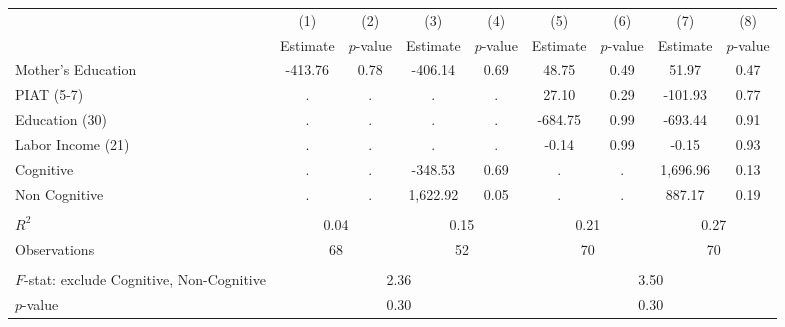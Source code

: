 \begin{tabular}{lcccccccc} \toprule
 & (1) & (2) & (3) & (4) & (5) & (6) & (7) & (8) \\
 & Estimate & $p$-value & Estimate & $p$-value  & Estimate & $p$-value  & Estimate & $p$-value  \\ \midrule 
Mother's Education &      -413.76 &         0.78 &      -406.14 &         0.69 &        48.75 &         0.49 &        51.97 &         0.47 \\  
PIAT (5-7) &            . &            . &            . &            . &        27.10 &         0.29 &      -101.93 &         0.77 \\  
Education (30) &            . &            . &            . &            . &      -684.75 &         0.99 &      -693.44 &         0.91 \\  
Labor Income (21) &            . &            . &            . &            . &        -0.14 &         0.99 &        -0.15 &         0.93 \\  
Cognitive &            . &            . &      -348.53 &         0.69 &            . &            . &     1,696.96 &         0.13 \\  
Non Cognitive &            . &            . &     1,622.92 &         0.05 &            . &            . &       887.17 &         0.19 \\  \\ \midrule 
$R^2$ &          \multicolumn{2}{c}{0.04} &             \multicolumn{2}{c}{0.15} &            \multicolumn{2}{c}{0.21} &              \multicolumn{2}{c}{0.27}   \\  
Observations &         \multicolumn{2}{c}{68} &                 \multicolumn{2}{c}{52} &               \multicolumn{2}{c}{70}  &                \multicolumn{2}{c}{70}   \\  \\ \midrule
$F$-stat: exclude Cognitive, Non-Cognitive  &                 \multicolumn{4}{c}{2.36} &              \multicolumn{4}{c}{3.50}  \\  
$p$-value &                \multicolumn{4}{c}{0.30} &               \multicolumn{4}{c}{0.30}  \\      \bottomrule \end{tabular}